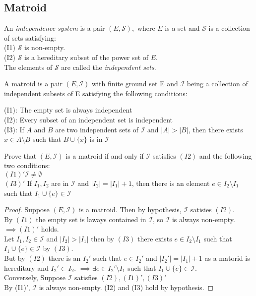 \documentclass[../main.tex]{subfiles}
\begin{document}
\subsection{Matroid}

\begin{defn}
An \textit{independence system} is a pair $(E,\mathcal{S}),$ where $E$ is a set and $\mathcal{S}$ is a collection of sets satisfying:\\
\noindent (I1) $\mathcal{S}$ is non-empty.\\
\noindent (I2) $\mathcal{S}$ is a  hereditary subset of the power set of $E$.\\
\noindent The elements of $\mathcal{S}$ are called the \textit{independent sets}.
\end{defn}

\begin{defn}
A matroid is a pair $(E,\mathcal{I})$ with finite ground set E and $\mathcal{I}$ being a collection of independent subsets of E satisfying the following conditions:

\vspace{2mm}

\noindent (I1): The empty set is always independent\\
\noindent (I2): Every subset of an independent set is independent\\
\noindent (I3): If $ A $ and $ B $ are two independent sets of $\mathcal{I}$ and $|A|>|B|$, then there exists $x \in A \setminus B$ such that $B \cup \{ x \}$ is in $\mathcal{I}$
\end{defn}

\begin{lem}
Prove that $(E,\mathcal{I})$ is a matroid if and only if $\mathcal{I}$ satisfies $(I2)$ and the following two conditions:\\
\noindent $(I1)' \mathcal{I} \neq \emptyset$\\
\noindent $(I3)'$ If $I_1,I_2$ are in $\mathcal{I}$ and $|I_2|=|I_1|+1$, then there is an element $e \in I_2 \setminus I_1$ such that $I_1 \cup \{e\} \in \mathcal{I}$
\end{lem}
\begin{proof}
Suppose $(E,\mathcal{I})$ is a matroid. Then by hypothesis, $\mathcal{I}$ satisies $(I2).$\\
\noindent By $(I1)$ the empty set is laways contained in $\mathcal{I}$, so $\mathcal{I}$ is always non-empty.\\
\noindent $\implies (I1)'$ holds.\\
\noindent Let $I_1,I_2 \in \mathcal{I}$ and $|I_2|>|I_1|$ then by $(I3)$ there exists $e \in I_2 \setminus I_1$ such that $I_1 \cup \{e\} \in \mathcal{I}$ by $(I3).$\\
\noindent But by $(I2)$ there is an $I_2'$ such that $e \in I_2'$ and $|I_2'|=|I_1|+1$ as a matorid is hereditary and $I_2' \subset I_2.$
$\implies \exists e \in I_2' \setminus I_1$ such that $I_1 \cup \{e\} \in \mathcal{I}.$\\
Conversely, Suppose $\mathcal{I}$ satisfies $(I2),(I1)',(I3)'$\\
\noindent By (I1)', $\mathcal{I}$ is always non-empty. (I2) and (I3) hold by hypothesis.
\end{proof}
\end{document}

